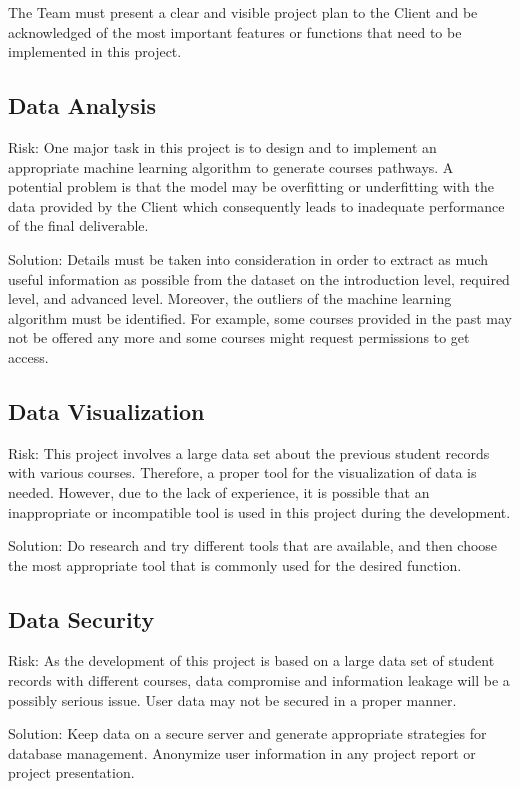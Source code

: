 \documentclass{article}
\begin{document}
\vspace{0.4cm}The Team must present a clear and visible project plan to the Client and be acknowledged of the most important features or functions that need to be implemented in this project.

\subsection{Data Analysis}
Risk: One major task in this project is to design and to implement an appropriate machine learning algorithm to generate courses pathways. A potential problem is that the model may be overfitting or underfitting with the data provided by the Client which consequently leads to inadequate performance of the final deliverable.

\vspace{0.4cm}Solution: Details must be taken into consideration in order to extract as much useful information as possible from the dataset on the introduction level, required level, and advanced level. Moreover, the outliers of the machine learning algorithm must be identified. For example, some courses provided in the past may not be offered any more and some courses might request permissions to get access.

\subsection{Data Visualization}
Risk: This project involves a large data set about the previous student records with various courses. Therefore, a proper tool for the visualization of data is needed. However, due to the lack of experience, it is possible that an inappropriate or incompatible tool is used in this project during the development.

\vspace{0.4cm}Solution: Do research and try different tools that are available, and then choose the most appropriate tool that is commonly used for the desired function.

\subsection{Data Security}
Risk: As the development of this project is based on a large data set of student records with different courses, data compromise and information leakage will be a possibly serious issue. User data may not be secured in a proper manner.

\vspace{0.4cm}Solution: Keep data on a secure server and generate appropriate strategies for database management. Anonymize user information in any project report or project presentation.
\end{document}
